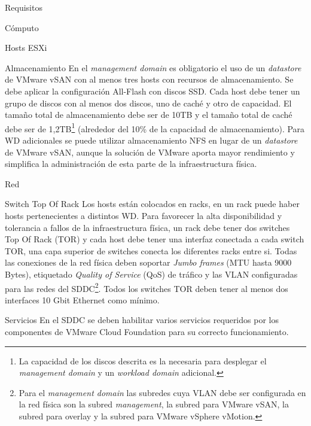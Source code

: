 \begin{section}{Requisitos}
\begin{subsection}{Cómputo}
\begin{subsubsection}{Hosts ESXi}
\end{subsubsection}
\end{subsection}
\begin{subsection}{Almacenamiento}
    En el \textit{management domain} es obligatorio el uso de un \textit{datastore} de VMware vSAN con al menos tres hosts con recursos de almacenamiento. Se debe aplicar la configuración All-Flash con discos SSD. Cada host debe tener un grupo de discos con al menos dos discos, uno de caché y otro de capacidad. El tamaño total de almacenamiento debe ser de 10TB y el tamaño	total de caché debe ser de 1,2TB\footnote{La capacidad de los discos descrita es la necesaria para desplegar el \textit{management domain} y un \textit{workload domain} adicional.} (alrededor del 10\% de la capacidad de almacenamiento). 
    Para WD adicionales se puede utilizar almacenamiento NFS en lugar de un \textit{datastore} de VMware vSAN, aunque la solución de VMware aporta mayor rendimiento y simplifica la administración de esta parte de la infraestructura física.
\end{subsection}
\begin{subsection}{Red}
 \begin{subsubsection}{Switch Top Of Rack}
     Los hosts están colocados en racks, en un rack puede haber hosts pertenecientes a distintos WD. Para favorecer la alta disponibilidad y tolerancia a fallos de la infraestructura física, un rack debe tener dos switches Top Of Rack (TOR) y cada host debe tener una interfaz conectada a cada switch TOR, una capa superior de switches conecta los diferentes racks entre si. Todas las conexiones de la red física deben soportar \textit{Jumbo frames} (MTU hasta 9000 Bytes), etiquetado \textit{Quality of Service} (QoS) de tráfico y las VLAN configuradas para las redes del SDDC\footnote{Para el \textit{management domain} las subredes cuya VLAN debe ser configurada en la red física son la subred \textit{management}, la subred para VMware vSAN, la subred para overlay y la subred para VMware vSphere vMotion.}. Todos los switches TOR deben tener al menos dos interfaces 10 Gbit Ethernet como mínimo. 
 \end{subsubsection}
 \begin{subsubsection}{Servicios}
     En el SDDC se deben habilitar varios servicios requeridos por los componentes de VMware Cloud Foundation para su correcto funcionamiento.

\end{subsubsection}
\end{subsection}
\end{section}
